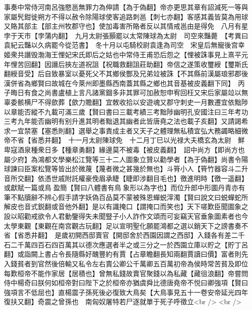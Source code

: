 事奏中常侍河南呂強愍邕無罪力為伸請【為于偽翻】帝亦更思其章有詔減死一等與家屬髠鉗徙朔方不得以赦令除陽球使客追路刺邕【刺七亦翻】客感其義皆莫為用球又賂其部主【部主州牧郡守也】使加毒害所賂者反以其情戒邕由是得免　八月有星孛于天市【孛蒲内翻】　九月太尉張顥罷以太常陳球為太尉　司空來豔薨　【考異曰袁紀云豔以久病罷今從范書】　冬十月以屯騎校尉袁逢為司空　宋皇后無寵後宫幸姬衆共譖毁渤海王悝妃宋氏即后之姑也中常侍王甫恐后怨之【悝被誅事見上熹平元年悝苦回翻】因譖后挾左道祝詛【祝職救翻詛莊助翻】帝信之遂策收璽綬【璽斯氏翻綬音受】后自致暴室以憂死父不其鄉侯酆及兄弟竝被誅【不其縣前漢屬琅邪郡後漢併省為鄉賢曰故城在今萊州即墨縣西南蓋其縣之鄉也其音基被皮義翻下同】　丙子晦日有食之尚書盧植上言凡諸黨錮多非其罪可加赦恕申宥回枉又宋后家屬竝以無辜委骸横尸不得歛葬【歛力贍翻】宜敇收拾以安遊魂又郡守刺史一月數遷宜依黜陟以章能否縱不九載可滿三歲【賢曰書曰三載考績三考黜陟幽明孔安國注曰三年考功三考九年能否幽明有别升進其明者黜退其幽者此皆唐堯之法也載子亥翻】又請謁希求一宜禁塞【塞悉則翻】選舉之事責成主者又天子之體理無私積宜弘大務蠲略細微帝不省【省悉井翻】　十一月太尉陳球免　十二月丁巳以光禄大夫橋玄為太尉　鮮卑寇酒泉種衆日多【種章勇翻】緣邊莫不被毒【被皮義翻】　詔中尚方【即尚方也屬少府】為鴻都文學樂松江覽等三十二人圖象立贊以勸學者【為于偽翻】尚書令陽球諫曰臣案松覽等皆出於微蔑【蔑者微之甚幾於無也】斗筲小人【筲竹器容斗二升音所交翻】依憑世戚附託權豪俛眉承睫【睫即涉翻目毛也】徼進明時【徼一遥翻】或獻賦一篇或鳥盈簡【賢曰八體書有鳥象形以為字也】而位升郎中形圖丹青亦有筆不點牘辭不辨心假手請字妖偽百品莫不蒙被殊恩蟬蜕滓濁【賢曰說文曰蜕蟬蛇所解皮也音式鋭翻或音他外翻】是以有識掩口【謂掩口而笑也】天下嗟歎臣聞圖象之設以昭勸戒欲令人君動鑒得失未聞豎子小人詐作文頌而可妄竊天官垂象圖素者也今太學東觀【東觀在南宫觀古玩翻】足以宣明聖化願罷鴻都之選以銷天下之謗書奏不省【省悉井翻】　是歲初開西邸賣官【開邸舍於西園因謂之西邸】入錢各有差二千石二千萬四百石四百萬其以德次應選者半之或三分之一於西園立庫以貯之【貯丁呂翻】或詣闕上書占令長隨縣好醜豐約有賈【占章瞻翻長知兩翻賈讀曰價】富者則先入錢貧者到官然後倍輸又私令左右賣公卿公千萬卿五百萬初帝為侯時常苦貧及即位每歎桓帝不能作家居【居積也】曾無私錢故賣官聚錢以為私藏【藏徂浪翻】帝嘗問侍中楊奇曰朕何如桓帝對曰陛下之於桓帝亦猶虞舜比德唐堯帝不悦曰卿強項【賢曰強項言不低屈也】直楊震子孫死後必復致大鳥矣【大鳥事見五十一卷安帝延光四年復扶又翻】奇震之曾孫也　南匈奴屠特若尸逐就單于死子呼徵立<br />
<br />
